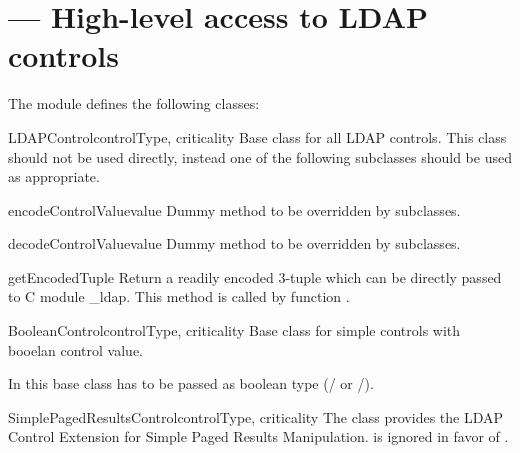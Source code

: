 
\section{ ---
  High-level access to LDAP controls }




The  module defines the following classes:

\begin{classdesc}{LDAPControl}{controlType, criticality }
Base class for all LDAP controls. This class should not be used directly,
instead one of the following subclasses should be used as appropriate.

\begin{methoddesc}[LDAPControl]{encodeControlValue}{value}
Dummy method to be overridden by subclasses.
\end{methoddesc}

\begin{methoddesc}[LDAPControl]{decodeControlValue}{value}
Dummy method to be overridden by subclasses.
\end{methoddesc}

\begin{methoddesc}[LDAPControl]{getEncodedTuple}{}
Return a readily encoded 3-tuple which can be directly
passed to C module _ldap. This method is called by
function .
\end{methoddesc}
\end{classdesc}

\begin{classdesc}{BooleanControl}{controlType, criticality }
Base class for simple controls with booelan control value.

In this base class  has to be passed as
boolean type (/ or /).
\end{classdesc}
\begin{classdesc}{SimplePagedResultsControl}{controlType, criticality }
The class provides the LDAP Control Extension for Simple Paged Results Manipulation.  is ignored
in favor of .
\begin{seealso}
\end{seealso}
\end{classdesc}

